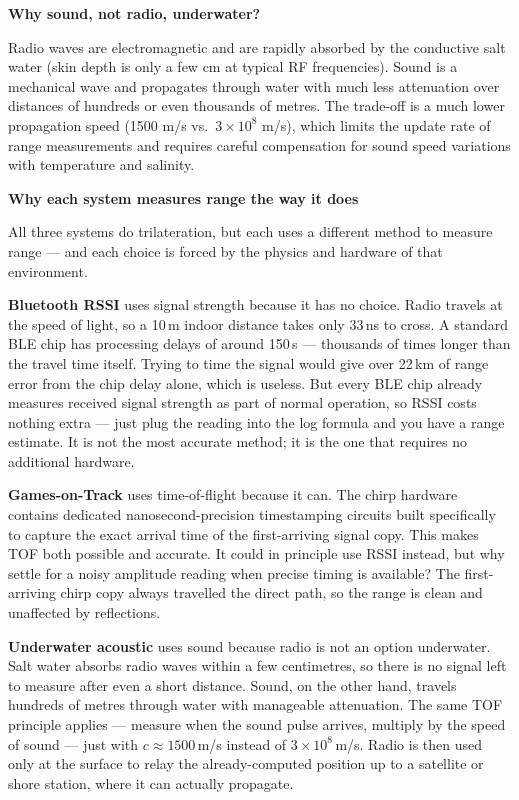 \documentclass[12pt, a4paper]{article}
\begin{document}
\begin{notebox}
  \textbf{Why sound, not radio, underwater?}

  Radio waves are electromagnetic and are rapidly absorbed by the
  conductive salt water (skin depth is only a few cm at typical RF
  frequencies).
  Sound is a mechanical wave and propagates through water with much
  less attenuation over distances of hundreds or even thousands of
  metres.
  The trade-off is a much lower propagation speed (1500 m/s vs.\
  $3\times10^8$ m/s), which limits the update rate of range
  measurements and requires careful compensation for sound speed
  variations with temperature and salinity.
\end{notebox}

\begin{notebox}
  \textbf{Why each system measures range the way it does}

  All three systems do trilateration, but each uses a different method
  to measure range --- and each choice is forced by the physics and
  hardware of that environment.

  \textbf{Bluetooth RSSI} uses signal strength because it has no
  choice.
  Radio travels at the speed of light, so a 10\,m indoor distance
  takes only 33\,ns to cross.
  A standard BLE chip has processing delays of around 150\,\textmu s
  --- thousands of times longer than the travel time itself.
  Trying to time the signal would give over 22\,km of range error
  from the chip delay alone, which is useless.
  But every BLE chip already measures received signal strength as
  part of normal operation, so RSSI costs nothing extra --- just
  plug the reading into the log formula and you have a range
  estimate.
  It is not the most accurate method; it is the one that requires no
  additional hardware.

  \textbf{Games-on-Track} uses time-of-flight because it can.
  The chirp hardware contains dedicated nanosecond-precision
  timestamping circuits built specifically to capture the exact
  arrival time of the first-arriving signal copy.
  This makes TOF both possible and accurate.
  It could in principle use RSSI instead, but why settle for a
  noisy amplitude reading when precise timing is available?
  The first-arriving chirp copy always travelled the direct path,
  so the range is clean and unaffected by reflections.

  \textbf{Underwater acoustic} uses sound because radio is not an
  option underwater.
  Salt water absorbs radio waves within a few centimetres, so there
  is no signal left to measure after even a short distance.
  Sound, on the other hand, travels hundreds of metres through water
  with manageable attenuation.
  The same TOF principle applies --- measure when the sound pulse
  arrives, multiply by the speed of sound --- just with
  $c \approx 1500$\,m/s instead of $3\times10^8$\,m/s.
  Radio is then used only at the surface to relay the already-computed
  position up to a satellite or shore station, where it can actually
  propagate.
\end{notebox}
\end{document}
